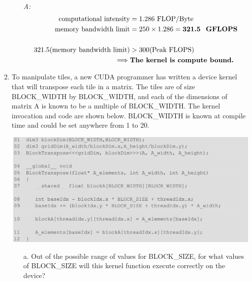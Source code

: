 \begin{enumerate}
\begin{itemize}
                    \\ \textsl{A: }
                    \begin{equation*}
                        \begin{aligned}
                            \text{computational intensity}        & = 1.286 \text{ FLOP/Byte}                          \\
                            \text{memory bandwidth limit}         & = 250 \times 1.286 = \textbf{321.5 \text{ GFLOPS}} \\\\
                            321.5 (\text{memory bandwidth limit}) & > 300 (\text{Peak FLOPS})                          \\
                            \implies                              & \textbf{The kernel is compute bound.}              \\
                        \end{aligned}
                    \end{equation*}
          \end{itemize}
          \pagebreak
    \item To manipulate tiles, a new CUDA programmer has written a device kernel that will transpose each tile in a matrix. The tiles are of size BLOCK\_WIDTH by BLOCK\_WIDTH, and each of the dimensions of matrix A is known to be a multiple of BLOCK\_WIDTH. The kernel invocation and code are shown below. BLOCK\_WIDTH is known at compile time and could be set anywhere from 1 to 20.
          \begin{center}
              \includegraphics[width=0.9\linewidth]{Images/Memories/blocktranspose.png}
          \end{center}
          \begin{itemize}
              \item[a.] Out of the possible range of values for BLOCK\_SIZE, for what values of BLOCK\_SIZE will this kernel function execute correctly on the device?

\end{itemize}
\end{enumerate}
